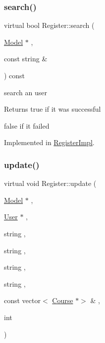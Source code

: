 \mbox{\label{classRegister_a243b58e5f1747437bab5175927cce26f}} 
\subsubsection{\texorpdfstring{search()}{search()}}
{\footnotesize\ttfamily virtual bool Register\+::search (\begin{DoxyParamCaption}\item[{\hyperlink{classModel}{Model} $\ast$}]{,  }\item[{const string \&}]{ }\end{DoxyParamCaption}) const\hspace{0.3cm}{\ttfamily [pure virtual]}}



search an user 

\begin{DoxyReturn}{Returns}
true if it was successful 

false if it failed 
\end{DoxyReturn}


Implemented in \hyperlink{classRegisterImpl_ad60a7330160adae90443acb547398bd9}{Register\+Impl}.

\mbox{\label{classRegister_ae1ca8b9044dff27a840a3d26fd5ea323}} 
\subsubsection{\texorpdfstring{update()}{update()}}
{\footnotesize\ttfamily virtual void Register\+::update (\begin{DoxyParamCaption}\item[{\hyperlink{classModel}{Model} $\ast$}]{,  }\item[{\hyperlink{classUser}{User} $\ast$}]{,  }\item[{string}]{,  }\item[{string}]{,  }\item[{string}]{,  }\item[{string}]{,  }\item[{const vector$<$ \hyperlink{classCourse}{Course} $\ast$$>$ \&}]{,  }\item[{int}]{ }\end{DoxyParamCaption})\hspace{0.3cm}{\ttfamily [pure virtual]}}



